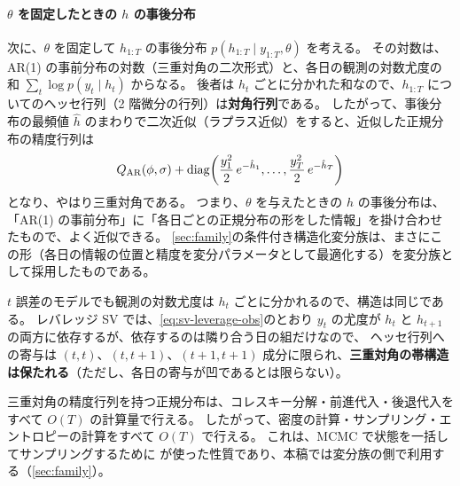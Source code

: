 \paragraph{$\theta$ を固定したときの $h$ の事後分布}
次に、$\theta$ を固定して $h_{1:T}$ の事後分布 $p(h_{1:T} \mid y_{1:T}, \theta)$ を考える。
その対数は、AR(1) の事前分布の対数（三重対角の二次形式）と、各日の観測の対数尤度の和 $\sum_t \log p(y_t \mid h_t)$ からなる。
後者は $h_t$ ごとに分かれた和なので、$h_{1:T}$ についてのヘッセ行列（2 階微分の行列）は\textbf{対角行列}である。
したがって、事後分布の最頻値 $\hat h$ のまわりで二次近似（ラプラス近似）をすると、近似した正規分布の精度行列は
\begin{equation}
  Q_{\mathrm{AR}}(\phi, \sigma) + \mathrm{diag}\!\left( \frac{y_1^2}{2}\,e^{-\hat h_1}, \dots, \frac{y_T^2}{2}\,e^{-\hat h_T} \right)
  \label{eq:laplace-precision}
\end{equation}
となり、やはり三重対角である。
つまり、$\theta$ を与えたときの $h$ の事後分布は、「AR(1) の事前分布」に「各日ごとの正規分布の形をした情報」を掛け合わせたもので、よく近似できる。
\cref{sec:family}の条件付き構造化変分族は、まさにこの形（各日の情報の位置と精度を変分パラメータとして最適化する）を変分族として採用したものである。

$t$ 誤差のモデルでも観測の対数尤度は $h_t$ ごとに分かれるので、構造は同じである。
レバレッジ SV では、\cref{eq:sv-leverage-obs}のとおり $y_t$ の尤度が $h_t$ と $h_{t+1}$ の両方に依存するが、依存するのは隣り合う日の組だけなので、
ヘッセ行列への寄与は $(t, t)$、$(t, t+1)$、$(t+1, t+1)$ 成分に限られ、\textbf{三重対角の帯構造は保たれる}（ただし、各日の寄与が凹であるとは限らない）。

三重対角の精度行列を持つ正規分布は、コレスキー分解・前進代入・後退代入をすべて $O(T)$ の計算量で行える。
したがって、密度の計算・サンプリング・エントロピーの計算をすべて $O(T)$ で行える。
これは、MCMC で状態を一括してサンプリングするために \textcite{chan2009} が使った性質であり、本稿では変分族の側で利用する（\cref{sec:family}）。

